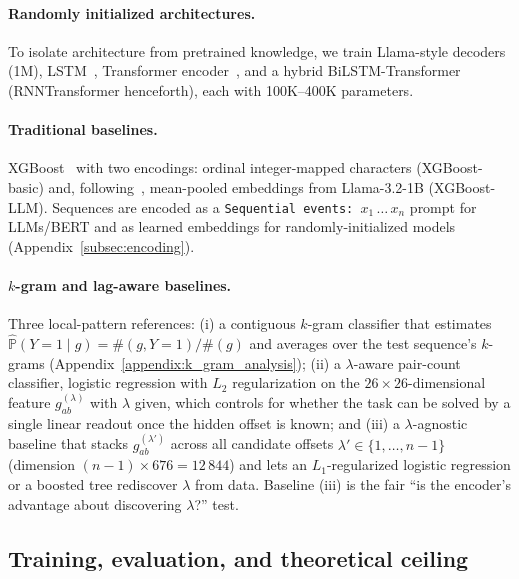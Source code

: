 \documentclass[fullpaper]{nldl}
\theoremstyle{plain}
\theoremstyle{definition}
\theoremstyle{remark}
\begin{document}
\paragraph{Randomly initialized architectures.} To isolate architecture from pretrained knowledge, we train Llama-style decoders (1M), LSTM~\citep{hochreiter1997lstm}, Transformer encoder~\citep{vaswani2017attention}, and a hybrid BiLSTM-Transformer~\citep{graves2005bilstm} (RNNTransformer henceforth), each with 100K--400K parameters.

\paragraph{Traditional baselines.} XGBoost~\citep{chen2016xgboost} with two encodings: ordinal integer-mapped characters (XGBoost-basic) and, following~\citet{XGBoost_LLMs, XGBoost_LLMs_HF}, mean-pooled embeddings from Llama-3.2-1B (XGBoost-LLM). Sequences are encoded as a \texttt{Sequential events: $x_1\,\ldots\,x_n$} prompt for LLMs/BERT and as learned embeddings for randomly-initialized models (Appendix~\ref{subsec:encoding}).

\paragraph{$k$-gram and lag-aware baselines.} Three local-pattern references: (i) a contiguous $k$-gram classifier that estimates $\hat{\mathbb{P}}(Y=1\mid g) = \#(g, Y=1)/\#(g)$ and averages over the test sequence's $k$-grams (Appendix~\ref{appendix:k_gram_analysis}); (ii) a $\lambda$-aware pair-count classifier, logistic regression with $L_2$ regularization on the $26\!\times\!26$-dimensional feature $g_{ab}^{(\lambda)}$ with $\lambda$ given, which controls for whether the task can be solved by a single linear readout once the hidden offset is known; and (iii) a $\lambda$-agnostic baseline that stacks $g_{ab}^{(\lambda')}$ across all candidate offsets $\lambda' \in \{1, \ldots, n{-}1\}$ (dimension $(n{-}1)\!\times\! 676 = 12\,844$) and lets an $L_1$-regularized logistic regression or a boosted tree rediscover $\lambda$ from data. Baseline (iii) is the fair ``is the encoder's advantage about discovering $\lambda$?'' test.

\subsection{Training, evaluation, and theoretical ceiling}
\label{subsec:training}
\label{subsec:evaluation}
\end{document}
